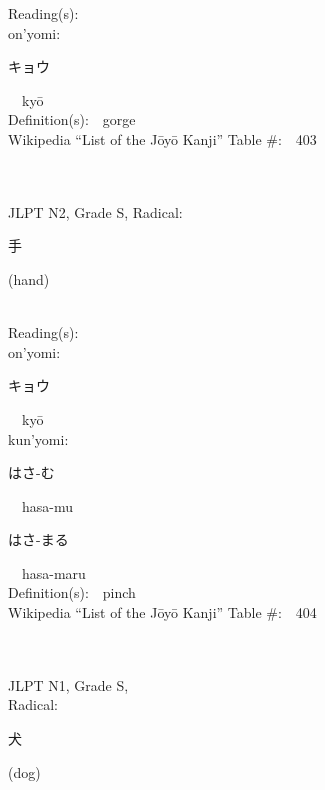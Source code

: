 \begin{multicols}{2}
Reading(s):\ \ \\
{\hspace*{1em}}on'yomi:\ \ \\
{\hspace*{2em}}{\begin{CJK}{UTF8}{min} キョウ \end{CJK}}\ \ ky\=o\ \ \\
Definition(s):\ \ gorge \\
Wikipedia ``List of the J\=oy\=o Kanji'' Table \#:\ \ 403 \\
\ \ \\
{\fontsize{34pt}{40pt}  }\ \ \\  %
{JLPT N2, Grade S, Radical:\ \ {\begin{CJK}{UTF8}{min} 手 \end{CJK}} (hand) } \\
Reading(s):\ \ \\
{\hspace*{1em}}on'yomi:\ \ \\
{\hspace*{2em}}{\begin{CJK}{UTF8}{min} キョウ \end{CJK}}\ \ ky\=o\ \ \\
{\hspace*{1em}}kun'yomi:\ \ \\
{\hspace*{2em}}{\begin{CJK}{UTF8}{min} はさ-む \end{CJK}}\ \ hasa-mu\ \ \\
{\hspace*{2em}}{\begin{CJK}{UTF8}{min} はさ-まる \end{CJK}}\ \ hasa-maru\ \ \\
Definition(s):\ \ pinch \\
Wikipedia ``List of the J\=oy\=o Kanji'' Table \#:\ \ 404 \\
\ \ \\
{\fontsize{34pt}{40pt}  }\ \ \\
{JLPT N1, Grade S, \\Radical:\ \ {\begin{CJK}{UTF8}{min} 犬 \end{CJK}} (dog) } \\

\end{multicols}
